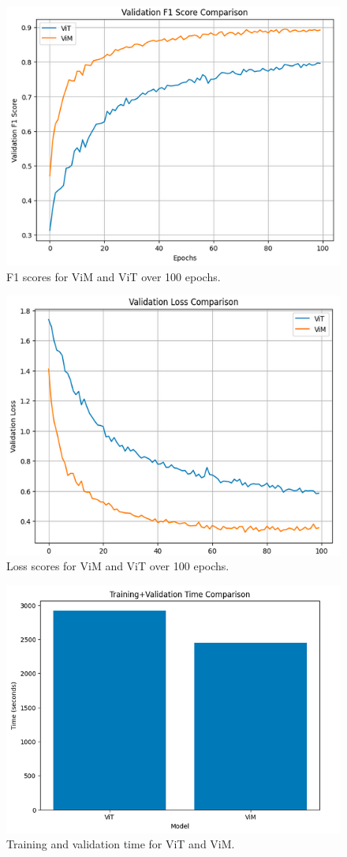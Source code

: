 \documentclass[conference]{IEEEtran}
\begin{document}
\begin{figure}[!t]
    \centering
    \includegraphics[width=0.75\columnwidth]{imgs/f1_comparison.png}
    \caption{F1 scores for ViM and ViT over 100 epochs.}
    \label{fig:ViMViTF1}
\end{figure}
\begin{figure}[!t]
    \centering
    \includegraphics[width=0.75\columnwidth]{imgs/loss_comparison.png}
    \caption{Loss scores for ViM and ViT over 100 epochs.}
    \label{fig:ViMViTLoss}
\end{figure}
\begin{figure}[!t]
    \centering
    \includegraphics[width=0.75\columnwidth]{imgs/time_comparison.png}
    \caption{Training and validation time for ViT and ViM.}
    \label{fig:ViMViTTrainingValidationTime}
\end{figure}
\end{document}
